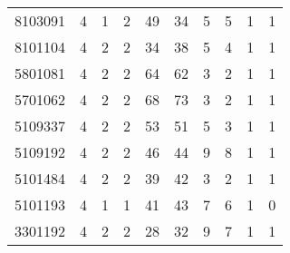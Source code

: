\begin{landscape}
\begin{center}
\begin{scriptsize}
\begin{longtable}{cccccccccc}
				8103091 & 4 & 1 & 2 & 49 & 34 & 5 & 5 & 1 & 1 \\ 
				8101104 & 4 & 2 & 2 & 34 & 38 & 5 & 4 & 1 & 1 \\ 
				5801081 & 4 & 2 & 2 & 64 & 62 & 3 & 2 & 1 & 1 \\ 
				5701062 & 4 & 2 & 2 & 68 & 73 & 3 & 2 & 1 & 1 \\ 
				5109337 & 4 & 2 & 2 & 53 & 51 & 5 & 3 & 1 & 1 \\ 
				5109192 & 4 & 2 & 2 & 46 & 44 & 9 & 8 & 1 & 1 \\ 
				5101484 & 4 & 2 & 2 & 39 & 42 & 3 & 2 & 1 & 1 \\ 
				5101193 & 4 & 1 & 1 & 41 & 43 & 7 & 6 & 1 & 0 \\ 
				3301192 & 4 & 2 & 2 & 28 & 32 & 9 & 7 & 1 & 1 \\ 
			\end{longtable}
		\end{scriptsize}
	\end{center}
\end{landscape}
